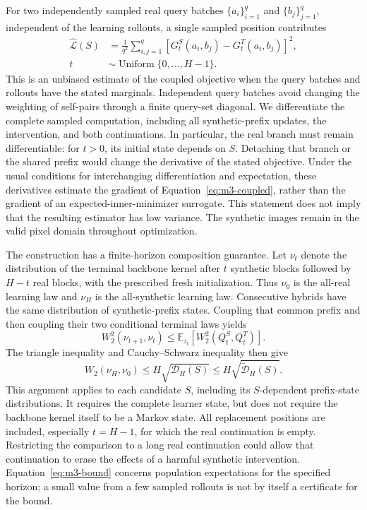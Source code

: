 For two independently sampled real query batches $\{a_i\}_{i=1}^{q}$ and $\{b_j\}_{j=1}^{q}$, independent of the learning rollouts, a single sampled position contributes
\begin{equation}
\begin{aligned}
\widehat{\mathcal L}(S)
&=\frac{1}{q^2}\sum_{i,j=1}^{q}
\left[G_t^S(a_i,b_j)-G_t^T(a_i,b_j)\right]^2,\\
t&\sim\operatorname{Uniform}\{0,\ldots,H-1\}.
\end{aligned}
\label{eq:m3-sampled}
\end{equation}
This is an unbiased estimate of the coupled objective when the query batches and rollouts have the stated marginals. Independent query batches avoid changing the weighting of self-pairs through a finite query-set diagonal. We differentiate the complete sampled computation, including all synthetic-prefix updates, the intervention, and both continuations. In particular, the real branch must remain differentiable: for $t>0$, its initial state depends on $S$. Detaching that branch or the shared prefix would change the derivative of the stated objective. Under the usual conditions for interchanging differentiation and expectation, these derivatives estimate the gradient of Equation~\eqref{eq:m3-coupled}, rather than the gradient of an expected-inner-minimizer surrogate. This statement does not imply that the resulting estimator has low variance. The synthetic images remain in the valid pixel domain throughout optimization.

The construction has a finite-horizon composition guarantee. Let $\nu_t$ denote the distribution of the terminal backbone kernel after $t$ synthetic blocks followed by $H-t$ real blocks, with the prescribed fresh initialization. Thus $\nu_0$ is the all-real learning law and $\nu_H$ is the all-synthetic learning law. Consecutive hybrids have the same distribution of synthetic-prefix states. Coupling that common prefix and then coupling their two conditional terminal laws yields
\begin{equation}
W_2^2(\nu_{t+1},\nu_t)
\le
\mathbb E_{z_t}\!\left[W_2^2\!\left(Q_t^S,Q_t^T\right)\right].
\label{eq:m3-mixture}
\end{equation}
The triangle inequality and Cauchy--Schwarz inequality then give
\begin{equation}
W_2(\nu_H,\nu_0)
\le H\sqrt{\mathcal D_H(S)}
\le H\sqrt{\widetilde{\mathcal D}_H(S)}.
\label{eq:m3-bound}
\end{equation}
This argument applies to each candidate $S$, including its $S$-dependent prefix-state distributions. It requires the complete learner state, but does not require the backbone kernel itself to be a Markov state. All replacement positions are included, especially $t=H-1$, for which the real continuation is empty. Restricting the comparison to a long real continuation could allow that continuation to erase the effects of a harmful synthetic intervention. Equation~\eqref{eq:m3-bound} concerns population expectations for the specified horizon; a small value from a few sampled rollouts is not by itself a certificate for the bound.

